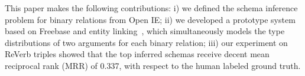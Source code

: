This paper makes the following contributions: i) we defined the schema
inference problem for binary relations from Open IE;
ii) we developed a prototype system based on Freebase and
entity linking~\cite{lin2012entity,ratinov2011local,hoffart2011robust,rao2013entity,CaiZZW13}, which simultaneously models the type distributions
of two arguments for each binary relation;
iii) our experiment on ReVerb triples showed that the top inferred schemas
receive decent mean reciprocal rank (MRR) of 0.337,
with respect to the human labeled ground truth.


